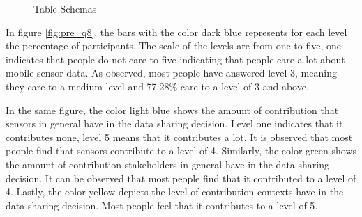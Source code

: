 \begin{figure}[htp]
\hspace{1em}
\caption{Table Schemas}
\label{fig:s3}
\end{figure}

In figure \ref{fig:pre_q8}, the bars with the color dark blue represents for each level the percentage of participants. The scale of the levels are from one to five, one indicates that people do not care to five indicating that people care a lot about mobile sensor data. As observed, most people have answered level 3, meaning they care to a medium level and 77.28\% care to a level of 3 and above.

In the same figure, the color light blue shows the amount of contribution that sensors in general have in the data sharing decision. Level one indicates that it contributes none, level 5 means that it contributes a lot. It is observed that most people find that sensors contribute to a level of 4. Similarly, the color green shows the amount of contribution stakeholders in general have in the data sharing decision. It can be observed that most people find that it contributed to a level of 4. Lastly, the color yellow depicts the level of contribution contexts have in the data sharing decision. Most people feel that it contributes to a level of 5.

